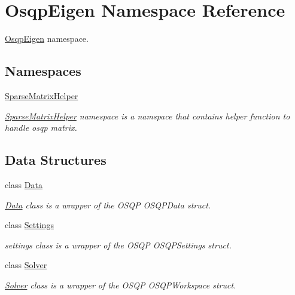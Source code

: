 \section{Osqp\+Eigen Namespace Reference}
\label{namespaceOsqpEigen}


\hyperlink{namespaceOsqpEigen}{Osqp\+Eigen} namespace.  


\subsection*{Namespaces}
\begin{DoxyCompactItemize}
\item 
 \hyperlink{namespaceOsqpEigen_1_1SparseMatrixHelper}{Sparse\+Matrix\+Helper}
\begin{DoxyCompactList}\small\item\em \hyperlink{namespaceOsqpEigen_1_1SparseMatrixHelper}{Sparse\+Matrix\+Helper} namespace is a namspace that contains helper function to handle osqp matrix. \end{DoxyCompactList}\end{DoxyCompactItemize}
\subsection*{Data Structures}
\begin{DoxyCompactItemize}
\item 
class \hyperlink{classOsqpEigen_1_1Data}{Data}
\begin{DoxyCompactList}\small\item\em \hyperlink{classOsqpEigen_1_1Data}{Data} class is a wrapper of the O\+S\+QP O\+S\+Q\+P\+Data struct. \end{DoxyCompactList}\item 
class \hyperlink{classOsqpEigen_1_1Settings}{Settings}
\begin{DoxyCompactList}\small\item\em settings class is a wrapper of the O\+S\+QP O\+S\+Q\+P\+Settings struct. \end{DoxyCompactList}\item 
class \hyperlink{classOsqpEigen_1_1Solver}{Solver}
\begin{DoxyCompactList}\small\item\em \hyperlink{classOsqpEigen_1_1Solver}{Solver} class is a wrapper of the O\+S\+QP O\+S\+Q\+P\+Workspace struct. \end{DoxyCompactList}\end{DoxyCompactItemize}
